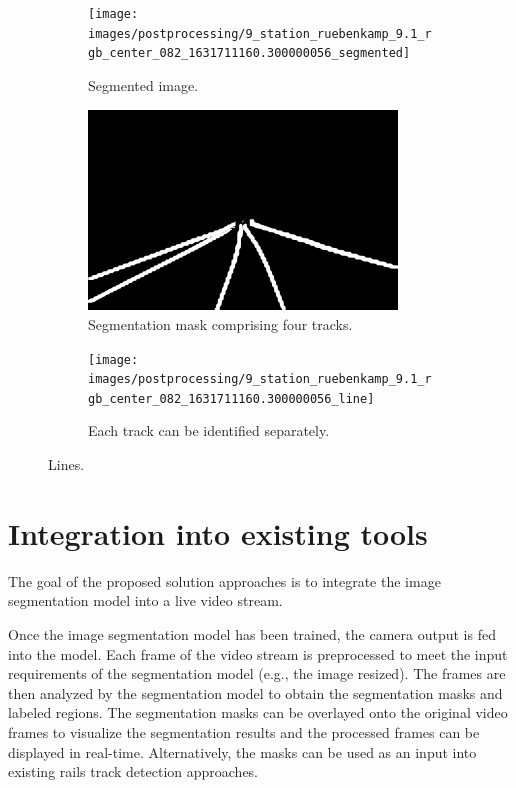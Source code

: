 \documentclass[Master,MDS,english]{BASE/twbook} %
\begin{document}
\begin{figure}
\centering
\begin{subfigure}[t]{.33\textwidth}
  \centering
  \texttt{[image: images/postprocessing/9\_station\_ruebenkamp\_9.1\_rgb\_center\_082\_1631711160.300000056\_segmented]}
  \caption{Segmented image.}
\end{subfigure}%
\begin{subfigure}[t]{.33\textwidth}
  \centering
  \includegraphics[width=0.9\textwidth]{images/postprocessing/9_station_ruebenkamp_9.1_rgb_center_082_1631711160.300000056_mask}
  \caption{Segmentation mask comprising four tracks.}
\end{subfigure}%
\begin{subfigure}[t]{.33\textwidth}
  \centering
  \texttt{[image: images/postprocessing/9\_station\_ruebenkamp\_9.1\_rgb\_center\_082\_1631711160.300000056\_line]}
  \caption{Each track can be identified separately. }
\end{subfigure}
\caption{Lines. }
\label{fig:postprocessing1}
\end{figure}




\section{Integration into existing tools}

The goal of the proposed solution approaches is to integrate the image segmentation model into a live video stream.

Once the image segmentation model has been trained, the camera output is fed into the model. Each frame of the video stream is preprocessed to meet the input requirements of the segmentation model (e.g., the image resized). The frames are then analyzed by the segmentation model to obtain the segmentation masks and labeled regions. 
The segmentation masks can be overlayed onto the original video frames to visualize the segmentation results and the processed frames can be displayed in real-time. Alternatively, the masks can be used as an input into existing rails track detection approaches.
\end{document}
